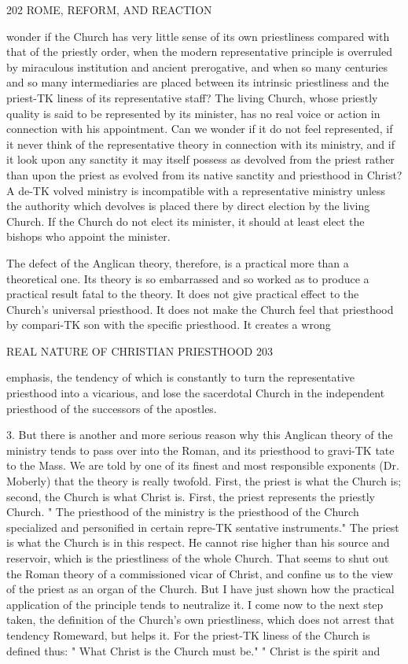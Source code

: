 \documentclass[12pt,a5paper,twoside]{book}
\begin{document}
{{202 ROME, REFORM, AND REACTION 

wonder if the Church has very little sense of its own 
priestliness compared with that of the priestly order, 
when the modern representative principle is overruled 
by miraculous institution and ancient prerogative, and 
when so many centuries and so many intermediaries are 
placed between its intrinsic priestliness and the priest-TK
liness of its representative staff? The living Church, 
whose priestly quality is said to be represented by its 
minister, has no real voice or action in connection 
with his appointment. Can we wonder if it do not 
feel represented, if it never think of the representative 
theory in connection with its ministry, and if it look 
upon any sanctity it may itself possess as devolved from 
the priest rather than upon the priest as evolved from 
its native sanctity and priesthood in Christ? A de-TK
volved ministry is incompatible with a representative 
ministry unless the authority which devolves is placed 
there by direct election by the living Church. If the 
Church do not elect its minister, it should at least 
elect the bishops who appoint the minister. 

The defect of the Anglican theory, therefore, is a 
practical more than a theoretical one. Its theory is 
so embarrassed and so worked as to produce a practical 
result fatal to the theory. It does not give practical 
effect to the Church's universal priesthood. It does 
not make the Church feel that priesthood by compari-TK
son with the specific priesthood. It creates a wrong 



REAL NATURE OF CHRISTIAN PRIESTHOOD 203 

emphasis, the tendency of which is constantly to turn 
the representative priesthood into a vicarious, and lose 
the sacerdotal Church in the independent priesthood 
of the successors of the apostles. 

3. But there is another and more serious reason 
why this Anglican theory of the ministry tends to 
pass over into the Roman, and its priesthood to gravi-TK
tate to the Mass. We are told by one of its finest 
and most responsible exponents (Dr. Moberly) that 
the theory is really twofold. First, the priest is what 
the Church is; second, the Church is what Christ is. 
First, the priest represents the priestly Church. " The 
priesthood of the ministry is the priesthood of the 
Church specialized and personified in certain repre-TK
sentative instruments." The priest is what the 
Church is in this respect. He cannot rise higher 
than his source and reservoir, which is the priestliness 
of the whole Church. That seems to shut out the 
Roman theory of a commissioned vicar of Christ, and 
confine us to the view of the priest as an organ of 
the Church. But I have just shown how the practical 
application of the principle tends to neutralize it. I 
come now to the next step taken, the definition of 
the Church's own priestliness, which does not arrest 
that tendency Romeward, but helps it. For the priest-TK
liness of the Church is defined thus: " What Christ 
is the Church must be." " Christ is the spirit and 



}}
\end{document}
